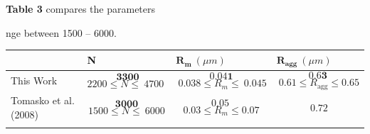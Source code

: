 \documentclass[final,5p,times,twocolumn]{elsarticle}
\begin{document}
\textbf{Table 3} compares the parameters

nge between 1500 -- 6000.
\begin{longtable}[]{@{}llll@{}}
\toprule
\begin{minipage}[b]{0.22\columnwidth}\raggedright\strut
\strut
\end{minipage} & \begin{minipage}[b]{0.22\columnwidth}\raggedright\strut
N\strut
\end{minipage} & \begin{minipage}[b]{0.22\columnwidth}\raggedright\strut
\(\mathbf{R}_{\mathbf{m}}\ (\mu m)\)\strut
\end{minipage} & \begin{minipage}[b]{0.22\columnwidth}\raggedright\strut
\(\mathbf{R}_{\mathbf{\text{agg}}}\ (\mu m)\)\strut
\end{minipage}\tabularnewline
\midrule
\endhead
\begin{minipage}[t]{0.24\columnwidth}\raggedright\strut
This Work\strut
\end{minipage} & \begin{minipage}[t]{0.24\columnwidth}\raggedright\strut
\[\ \mathbf{\ 3300}\ \] \[2200\leq N\leq\ 4700\ \]\strut
\end{minipage} & \begin{minipage}[t]{0.24\columnwidth}\raggedright\strut
\[\mathbf{0.04}\mathbf{1}\] \[\ 0.038\leq R_{m}\leq\ 0.045\]\strut
\end{minipage} & \begin{minipage}[t]{0.24\columnwidth}\raggedright\strut
\[\mathbf{0.6}\mathbf{3}\] \[\ 0.61\leq R_{\text{agg}}\leq 0.65\]\strut
\end{minipage}\tabularnewline
\begin{minipage}[t]{0.24\columnwidth}\raggedright\strut
Tomasko et al. (2008)\strut
\end{minipage} & \begin{minipage}[t]{0.24\columnwidth}\raggedright\strut
\[\ \mathbf{3000\ }\] \[1500\leq N\leq\ 6000\]\strut
\end{minipage} & \begin{minipage}[t]{0.24\columnwidth}\raggedright\strut
\[\mathbf{0.05\ }\] \[0.03\leq R_{m}\leq 0.07\]\strut
\end{minipage} & \begin{minipage}[t]{0.24\columnwidth}\raggedright\strut
\[\ \mathbf{0.72}\]\strut
\end{minipage}\tabularnewline
\begin{minipage}[t]{0.24\columnwidth}\raggedright\strut

\end{minipage}
\end{longtable}
\end{document}
